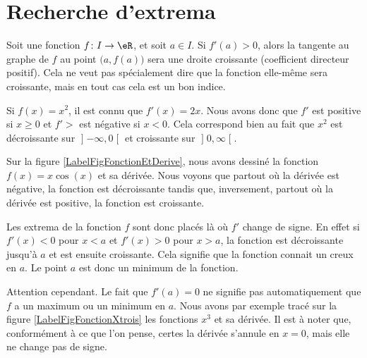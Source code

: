 \section{Recherche d'extrema}

Soit une fonction $f\colon I\to \eR$, et soit $a\in I$. Si $f'(a)>0$, alors la tangente au graphe de $f$ au point $\big( a,f(a) \big)$ sera une droite croissante (coefficient directeur positif). Cela ne veut pas spécialement dire que la fonction elle-même sera croissante, mais en tout cas cela est un bon indice.

\begin{example}
	Si $f(x)=x^2$, il est connu que $f'(x)=2x$. Nous avons donc que $f'$ est positive si $x\geq 0$ et $f'>$ est négative si $x<0$. Cela correspond bien au fait que $x^2$ est décroissante sur $\mathopen] -\infty , 0 \mathclose[$ et croissante sur $\mathopen] 0 , \infty \mathclose[$.
\end{example}
 
Sur la figure \ref{LabelFigFonctionEtDerive}, nous avons dessiné la fonction $f(x)=x\cos(x)$ et sa dérivée. Nous voyons que partout où la dérivée est négative, la fonction est décroissante tandis que, inversement, partout où la dérivée est positive, la fonction est croissante.
\newcommand{\CaptionFigFonctionEtDerive}{La fonction $f(x)=x\cos(x)$ en bleu et sa dérivée en rouge.}


Les extrema de la fonction $f$ sont donc placés là où $f'$ change de signe. En effet si $f'(x)<0$ pour $x<a$ et $f'(x)>0$ pour $x>a$, la fonction est décroissante jusqu'à $a$ et est ensuite croissante. Cela signifie que la fonction connait un creux en $a$. Le point $a$ est donc un minimum de la fonction.

Attention cependant. Le fait que $f'(a)=0$ ne signifie pas automatiquement que $f$ a un maximum ou un minimum en $a$. Nous avons par exemple tracé sur la figure \ref{LabelFigFonctionXtrois} les fonctions $x^3$ et sa dérivée. Il est à noter que, conformément à ce que l'on pense, certes la dérivée s'annule en $x=0$, mais elle ne change pas de signe.
\newcommand{\CaptionFigFonctionXtrois}{La dérivée de $x^3$ s'annule en $x=0$, mais ce n'est ni un minimum ni un maximum.}


